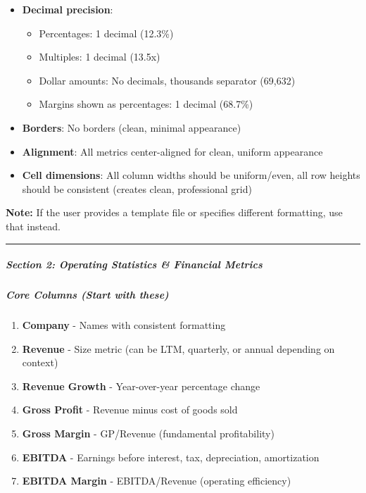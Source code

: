 \documentclass[11pt]{article}
\begin{document}
\begin{itemize}[leftmargin=*,itemsep=2pt,topsep=2pt]
\item {} \textbf{Decimal precision}:
\begin{itemize}[leftmargin=*,itemsep=2pt,topsep=2pt]
\item {} Percentages: 1 decimal (12.3\%)
\item {} Multiples: 1 decimal (13.5x)
\item {} Dollar amounts: No decimals, thousands separator (69,632)
\item {} Margins shown as percentages: 1 decimal (68.7\%)
\end{itemize}
\item {} \textbf{Borders}: No borders (clean, minimal appearance)
\item {} \textbf{Alignment}: All metrics center-aligned for clean, uniform appearance
\item {} \textbf{Cell dimensions}: All column widths should be uniform/even, all row heights should be consistent (creates clean, professional grid)
\end{itemize}

\textbf{Note:} If the user provides a template file or specifies different formatting, use that instead.


\vspace{0.5em}\hrule\vspace{0.5em}

\subparagraph{Section 2: Operating Statistics \& Financial Metrics}\mbox{}\par

\subparagraph{Core Columns (Start with these)}\mbox{}\par
\begin{enumerate}[leftmargin=*,itemsep=2pt,topsep=2pt]
\item {} \textbf{Company} - Names with consistent formatting
\item {} \textbf{Revenue} - Size metric (can be LTM, quarterly, or annual depending on context)
\item {} \textbf{Revenue Growth} - Year-over-year percentage change
\item {} \textbf{Gross Profit} - Revenue minus cost of goods sold
\item {} \textbf{Gross Margin} - GP/Revenue (fundamental profitability)
\item {} \textbf{EBITDA} - Earnings before interest, tax, depreciation, amortization
\item {} \textbf{EBITDA Margin} - EBITDA/Revenue (operating efficiency)
\end{enumerate}
\end{document}
